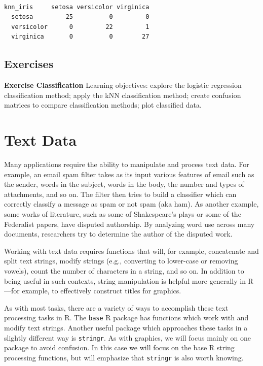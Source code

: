 \documentclass[
]{krantz}
\begin{document}
\begin{verbatim}
            
knn_iris     setosa versicolor virginica
  setosa         25          0         0
  versicolor      0         22         1
  virginica       0          0        27
\end{verbatim}

\hypertarget{exercises-7}{%
\section{Exercises}\label{exercises-7}}

\textbf{Exercise Classification} Learning objectives: explore the logistic regression classification method; apply the kNN classification method; create confusion matrices to compare classification methods; plot classified data.

\hypertarget{xml}{%
\chapter{Text Data}\label{xml}}

Many applications require the ability to manipulate and process text data. For example, an email spam filter takes as its input various features of email such as the sender, words in the subject, words in the body, the number and types of attachments, and so on. The filter then tries to build a classifier which can correctly classify a message as spam or not spam (aka ham). As another example, some works of literature, such as some of Shakespeare's plays or some of the Federalist papers, have disputed authorship. By analyzing word use across many documents, researchers try to determine the author of the disputed work.

Working with text data requires functions that will, for example, concatenate and split text strings, modify strings (e.g., converting to lower-case or removing vowels), count the number of characters in a string, and so on. In addition to being useful in such contexts, string manipulation is helpful more generally in R---for example, to effectively construct titles for graphics.

As with most tasks, there are a variety of ways to accomplish these text processing tasks in R. The \texttt{base} R package has functions which work with and modify text strings. Another useful package which approaches these tasks in a slightly different way is \texttt{stringr}. As with graphics, we will focus mainly on one package to avoid confusion. In this case we will focus on the base R string processing functions, but will emphasize that \texttt{stringr} is also worth knowing.
\end{document}
